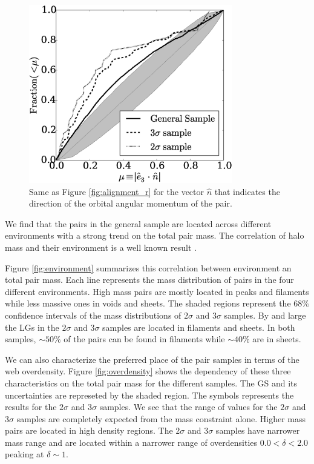 \documentclass{iau}
\begin{document}
\begin{figure}[b]
\begin{center}
 \includegraphics[width=3.5in]{alignments_e3_n_all_environments.eps} 
 \caption{Same as Figure \ref{fig:alignment_r} for the vector $\hat
   n$ that indicates the direction of the orbital angular momentum of
   the pair.}
   \label{fig:alignment_n}
\end{center}
\end{figure}


We find that the pairs in the general sample are located across
different environments with a strong trend on the total pair
mass. The correlation of halo mass and their environment is a
well known result \cite{1998ApJ...500...14L}.



Figure \ref{fig:environment} summarizes this correlation between
environment an total pair mass. Each line represents the mass
distribution of pairs in the four different environments. High mass
pairs are mostly located in peaks and filaments while less massive
ones in voids and sheets.  The shaded regions represent the $68\%$
confidence intervals of the mass distributions of $2\sigma$ and
$3\sigma$ samples. By and large the LGs in the $2\sigma$ and $3\sigma$ samples are
located in filaments and sheets. In both samples, $\sim 50\%$ of the
pairs can be found in filaments while $\sim 40\%$ are in sheets. 

We can also characterize the preferred place of the pair samples in terms of the
web overdensity.  Figure \ref{fig:overdensity} shows the dependency of these three
characteristics on the total pair mass for the different samples. The
GS and its uncertainties are represeted by the shaded region. The
symbols represents the results for the $2\sigma$ and $3\sigma$ samples.   
We see that the range of values for the $2\sigma$ and $3\sigma$
samples are completely expected from the mass constraint alone. Higher
mass pairs are located in high density regions. The $2\sigma$ and
$3\sigma$ samples have narrower mass range and are located within a
narrower range of overdensities $0.0<\delta<2.0$ peaking at $\delta \sim 1$. 
\end{document}
